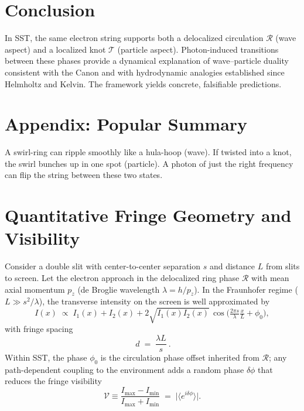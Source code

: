 \documentclass[11pt,a4paper]{article}
\begin{document}
    \section{Conclusion}

    In SST, the same electron string supports both a delocalized circulation $\mathcal R$ (wave aspect) and a localized knot $\mathcal T$ (particle aspect). Photon-induced transitions between these phases provide a dynamical explanation of wave--particle duality consistent with the Canon and with hydrodynamic analogies established since Helmholtz and Kelvin. The framework yields concrete, falsifiable predictions.

\appendix
\section*{Appendix: Popular Summary}

A swirl-ring can ripple smoothly like a hula-hoop (wave).
If twisted into a knot, the swirl bunches up in one spot (particle).
A photon of just the right frequency can flip the string between these two states.


\section{Quantitative Fringe Geometry and Visibility}

Consider a double slit with center-to-center separation $s$ and distance $L$ from slits to screen.
Let the electron approach in the delocalized ring phase $\mathcal R$ with mean axial momentum $p_z$ (de Broglie wavelength $\lambda=h/p_z$).
In the Fraunhofer regime ($L \gg s^2/\lambda$), the transverse intensity on the screen is well approximated by
\begin{equation}
I(x) \;\propto\; I_1(x) + I_2(x) + 2\sqrt{I_1(x)I_2(x)}\,\cos\!\Big(\tfrac{2\pi s}{\lambda}\tfrac{x}{L} + \phi_0\Big),
\end{equation}
with fringe spacing
\begin{equation}
\boxed{\ d \;=\; \frac{\lambda L}{s}\ }.
\end{equation}
Within SST, the phase $\phi_0$ is the circulation phase offset inherited from $\mathcal R$; any path-dependent coupling to the environment adds a random phase $\delta\phi$ that reduces the fringe visibility
\begin{equation}
\mathcal V \equiv \frac{I_{\max}-I_{\min}}{I_{\max}+I_{\min}} \;=\; \big|\langle e^{i \delta\phi}\rangle\big|.
\end{equation}
\end{document}
